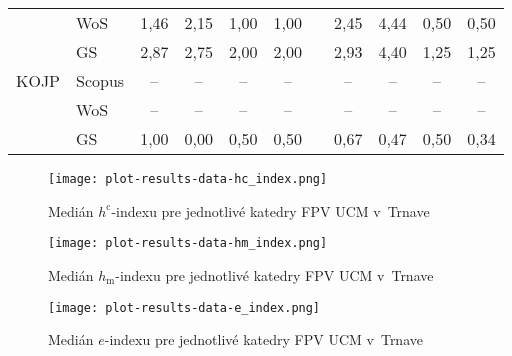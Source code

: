 \begin{table}
\begin{tabularx}{\textwidth}{Xlcccclcccc}
         & WoS    & 1,46  & 2,15 & 1,00  & 1,00 & & 2,45  & 4,44 & 0,50 & 0,50 \\
         & GS     & 2,87  & 2,75 & 2,00  & 2,00 & & 2,93  & 4,40 & 1,25 & 1,25 \\[1ex]
    KOJP & Scopus & --    & --   & --    & --   & & --    & --   & --   & --   \\
         & WoS    & --    & --   & --    & --   & & --    & --   & --   & --   \\
         & GS     & 1,00  & 0,00 & 0,50  & 0,50 & & 0,67  & 0,47 & 0,50 & 0,34 \\
    \bottomrule
  \end{tabularx}
\end{table}

\begin{figure}
  \centering
  \texttt{[image: plot-results-data-hc\_index.png]}
  \caption{Medián $h^\mathrm{c}$-indexu pre jednotlivé katedry FPV UCM v~Trnave}
  \label{fig:hc-index.plot}
\end{figure}

\begin{figure}
  \centering
  \texttt{[image: plot-results-data-hm\_index.png]}
  \caption{Medián $h_\mathrm{m}$-indexu pre jednotlivé katedry FPV UCM v~Trnave}
  \label{fig:hm-index.plot}
\end{figure}

\begin{figure}
  \centering
  \texttt{[image: plot-results-data-e\_index.png]}
  \caption{Medián $e$-indexu pre jednotlivé katedry FPV UCM v~Trnave}
  \label{fig:e-index.plot}
\end{figure}


